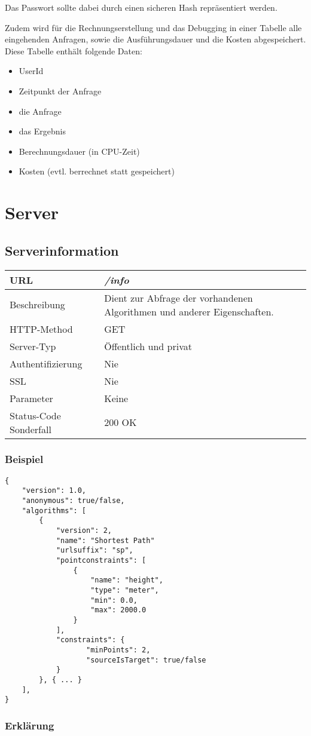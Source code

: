 \documentclass[ngerman,titlepage,parskip=true]{scrartcl}
\newcommand{\requestURL}[1]{\textit{#1}}
\newcommand{\request}[9]
{\subsection{#1}
\begin{tabular}{|p{0.2\textwidth}|p{0.7\textwidth}|}
\hline
  URL & \requestURL{#2}\\\hline
    Beschreibung & #3\\\hline
  HTTP-Method & #4\\\hline
  Server-Typ & #5\\\hline
  Authentifizierung & #6\\\hline
  SSL & #7\\\hline
  Parameter & #8\\\hline
  Status-Code Sonderfall & #9\\\hline
 \end{tabular}\vspace*{1em}}
{}%
{}%
{}%
{}%
{}%
{}%
{}%
{}%
\begin{document}
	Das Passwort sollte dabei durch einen sicheren Hash repräsentiert werden.
	
	Zudem wird für die Rechnungserstellung und das Debugging in einer Tabelle alle eingehenden Anfragen, sowie die Ausführungsdauer und die Kosten abgespeichert.
	Diese Tabelle enthält folgende Daten:
	
	\begin{itemize}
		\item UserId
		\item Zeitpunkt der Anfrage
		\item die Anfrage
		\item das Ergebnis
		\item Berechnungsdauer (in CPU-Zeit)
		\item Kosten (evtl. berrechnet statt gespeichert)
	\end{itemize}	

\clearpage
\section{Server}

\request{Serverinformation}
{/info}
{Dient zur Abfrage der vorhandenen Algorithmen und anderer Eigenschaften.}
{GET}
{Öffentlich und privat}
{Nie}
{Nie}
{Keine}
{200 OK}
\subsubsection{Beispiel}
	
	\begin{lstlisting}
{
    "version": 1.0,
    "anonymous": true/false,
    "algorithms": [
        {
            "version": 2,
            "name": "Shortest Path"
            "urlsuffix": "sp",
            "pointconstraints": [                    
                {
                    "name": "height",
                    "type": "meter",
                    "min": 0.0,
                    "max": 2000.0
                }
            ],
            "constraints": {
                   "minPoints": 2,
                   "sourceIsTarget": true/false 
            }
        }, { ... }
    ],
}
    \end{lstlisting}
    \subsubsection*{Erklärung}
    
\end{document}

